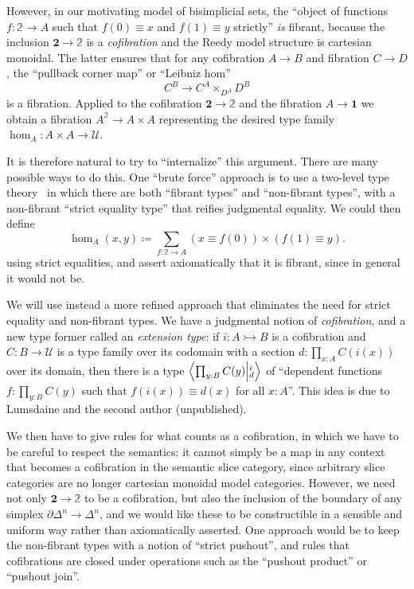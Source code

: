 \documentclass{amsart}
\theoremstyle{plain}
\theoremstyle{definition}
\theoremstyle{remark}
\numberwithin{equation}{section}
\newcommand{\exten}[4]{\left\langle\mathchoice{\textstyle\prod_{#1}}{\textstyle\prod_{#1}}{\scriptstyle\prod_{#1}}{\scriptscriptstyle\prod_{#1}} #2 \middle|^{#3}_{#4}\right\rangle}
\newcommand{\jdeq}{\equiv}
\newcommand{\defeq}{\coloneqq}
\newcommand{\unittype}{\ensuremath{\mathbf{1}}}
\newcommand{\booltype}{\ensuremath{\mathbf{2}}}
\newcommand{\univtype}{\mathcal{U}}
\newcommand{\two}{\mathbb{2}}
\begin{document}
However, in our motivating model of bisimplicial sets, the ``object of functions $f:\two\to A$ such that $f(0)\jdeq x$ and $f(1)\jdeq y$ strictly'' \emph{is} fibrant, because the inclusion $\booltype\to\two$ is a \emph{cofibration} and the Reedy model structure is cartesian monoidal.
The latter ensures that for any cofibration $A\to B$ and fibration $C\to D$, the ``pullback corner map'' or ``Leibniz hom''
\[ C^B \to C^A \times_{D^A} D^B \]
is a fibration.
Applied to the cofibration $\booltype\to \two$ and the fibration $A\to \unittype$ we obtain a fibration $A^\two \to A\times A$ representing the desired type family $\hom_A : A\times A \to \univtype$.

It is therefore natural to try to ``internalize'' this argument.
There are many possible ways to do this.
One ``brute force'' approach is to use a two-level type theory~\cite{hts,ack:two-level} in which there are both ``fibrant types'' and ``non-fibrant types'', with a non-fibrant ``strict equality type'' that reifies judgmental equality.
We could then define
\[ \hom_A(x,y) \defeq \sum_{f:\two\to A} (x\jdeq f(0)) \times (f(1)\jdeq y). \]
using strict equalities, and assert axiomatically that it is fibrant, since in general it would not be.

We will use instead a more refined approach that eliminates the need for strict equality and non-fibrant types.
We have a judgmental notion of \emph{cofibration}, and a new type former called an \emph{extension type}: if $i:A\rightarrowtail B$ is a cofibration and $C:B\to\univtype$ is a type family over its codomain with a section $d:\prod_{x:A} C(i(x))$ over its domain, then there is a type $\exten{y:B}{C(y)}{i}{d}$ of ``dependent functions $f:\prod_{y:B} C(y)$ such that $f(i(x))\jdeq d(x)$ for all $x:A$''.
This idea is due to Lumsdaine and the second author (unpublished).

We then have to give rules for what counts as a cofibration, in which we have to be careful to respect the semantics: it cannot simply be a map in any context that becomes a cofibration in the semantic slice category, since arbitrary slice categories are no longer cartesian monoidal model categories.
However, we need not only $\booltype\to\two$ to be a cofibration, but also the inclusion of the boundary of any simplex $\partial \Delta^n \to \Delta^n$, and we would like these to be constructible in a sensible and uniform way rather than axiomatically asserted.
One approach would be to keep the non-fibrant types with a notion of ``strict pushout'', and rules that cofibrations are closed under operations such as the ``pushout product'' or ``pushout join''.
\end{document}
